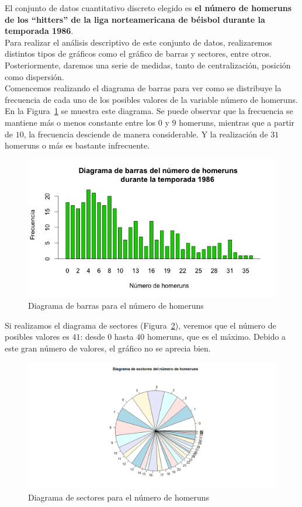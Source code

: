 \documentclass[12pt,a4paper,twoside,openright,titlepage,final]{article}
\begin{document}
El conjunto de datos cuantitativo discreto elegido es \textbf{el número de homeruns de los ``hitters'' de la liga norteamericana de béisbol durante la temporada 1986}.\\

Para realizar el análisis descriptivo de este conjunto de datos, realizaremos distintos tipos de gráficos como el gráfico de barras y sectores, entre otros. Posteriormente, daremos una serie de medidas, tanto de centralización, posición como dispersión.\\

Comencemos realizando el diagrama de barras para ver como se distribuye la frecuencia de cada uno de los posibles valores de la variable número de homeruns. En la Figura~\ref{fig:diagrama_barras_homeruns} se muestra este diagrama. Se puede observar que la frecuencia se mantiene más o menos constante entre los $0$ y $9$ homeruns, mientras que a partir de $10$, la frecuencia desciende de manera considerable. Y la realización de $31$ homeruns o más es bastante infrecuente.\\

\begin{figure}[tbph!]
\centering
\includegraphics[width=0.8\linewidth]{imagenes/diagrama_barras_homeruns}
\caption{Diagrama de barras para el número de homeruns}
\label{fig:diagrama_barras_homeruns}
\end{figure}

Si realizamos el diagrama de sectores (Figura~\ref{fig:diagrama_sector_homeruns}), veremos que el número de posibles valores es $41$: desde $0$ hasta $40$ homeruns, que es el máximo. Debido a este gran número de valores, el gráfico no se aprecia bien.\\

\begin{figure}[tbph!]
\centering
\includegraphics[width=\linewidth]{imagenes/diagrama_sectores_homeruns}
\caption{Diagrama de sectores para el número de homeruns}
\label{fig:diagrama_sector_homeruns}
\end{figure}
\end{document}
